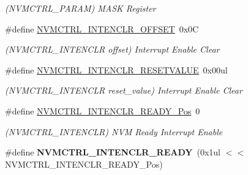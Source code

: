 \begin{DoxyCompactItemize}
\begin{DoxyCompactList}\small\item\em (N\+V\+M\+C\+T\+R\+L\+\_\+\+P\+A\+R\+A\+M) M\+A\+S\+K Register \end{DoxyCompactList}\item 
\hypertarget{group___s_a_m_l21___n_v_m_c_t_r_l_gaf69e18ecea21ffbf47dc28f66161a768}{}\#define \hyperlink{group___s_a_m_l21___n_v_m_c_t_r_l_gaf69e18ecea21ffbf47dc28f66161a768}{N\+V\+M\+C\+T\+R\+L\+\_\+\+I\+N\+T\+E\+N\+C\+L\+R\+\_\+\+O\+F\+F\+S\+E\+T}~0x0\+C\label{group___s_a_m_l21___n_v_m_c_t_r_l_gaf69e18ecea21ffbf47dc28f66161a768}

\begin{DoxyCompactList}\small\item\em (N\+V\+M\+C\+T\+R\+L\+\_\+\+I\+N\+T\+E\+N\+C\+L\+R offset) Interrupt Enable Clear \end{DoxyCompactList}\item 
\hypertarget{group___s_a_m_l21___n_v_m_c_t_r_l_gacc5d7dab614b1d4e05402a8c97de3954}{}\#define \hyperlink{group___s_a_m_l21___n_v_m_c_t_r_l_gacc5d7dab614b1d4e05402a8c97de3954}{N\+V\+M\+C\+T\+R\+L\+\_\+\+I\+N\+T\+E\+N\+C\+L\+R\+\_\+\+R\+E\+S\+E\+T\+V\+A\+L\+U\+E}~0x00ul\label{group___s_a_m_l21___n_v_m_c_t_r_l_gacc5d7dab614b1d4e05402a8c97de3954}

\begin{DoxyCompactList}\small\item\em (N\+V\+M\+C\+T\+R\+L\+\_\+\+I\+N\+T\+E\+N\+C\+L\+R reset\+\_\+value) Interrupt Enable Clear \end{DoxyCompactList}\item 
\hypertarget{group___s_a_m_l21___n_v_m_c_t_r_l_gaf655addcfd79db2cb6324f92209a9896}{}\#define \hyperlink{group___s_a_m_l21___n_v_m_c_t_r_l_gaf655addcfd79db2cb6324f92209a9896}{N\+V\+M\+C\+T\+R\+L\+\_\+\+I\+N\+T\+E\+N\+C\+L\+R\+\_\+\+R\+E\+A\+D\+Y\+\_\+\+Pos}~0\label{group___s_a_m_l21___n_v_m_c_t_r_l_gaf655addcfd79db2cb6324f92209a9896}

\begin{DoxyCompactList}\small\item\em (N\+V\+M\+C\+T\+R\+L\+\_\+\+I\+N\+T\+E\+N\+C\+L\+R) N\+V\+M Ready Interrupt Enable \end{DoxyCompactList}\item 
\hypertarget{group___s_a_m_l21___n_v_m_c_t_r_l_ga442a07f4d8e084c114976267dfc2dc86}{}\#define {\bfseries N\+V\+M\+C\+T\+R\+L\+\_\+\+I\+N\+T\+E\+N\+C\+L\+R\+\_\+\+R\+E\+A\+D\+Y}~(0x1ul $<$$<$ N\+V\+M\+C\+T\+R\+L\+\_\+\+I\+N\+T\+E\+N\+C\+L\+R\+\_\+\+R\+E\+A\+D\+Y\+\_\+\+Pos)\label{group___s_a_m_l21___n_v_m_c_t_r_l_ga442a07f4d8e084c114976267dfc2dc86}


\end{DoxyCompactItemize}
